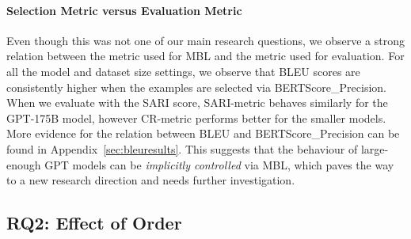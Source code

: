 \documentclass[11pt]{article}
\begin{document}
\begin{table}[!htp]
\begin{center}
\end{center}
\end{table}

\paragraph{Selection Metric versus Evaluation Metric} Even though this was not one of our main research questions, we observe a strong relation between the metric used for MBL and the metric used for evaluation. For all the model and dataset size settings, we observe that BLEU scores are consistently higher when the examples are selected via BERTScore\_Precision. When we evaluate with the SARI score, SARI-metric behaves similarly for the GPT-175B model, however CR-metric performs better for the smaller models. More evidence for the relation between BLEU and BERTScore\_Precision can be found in Appendix~\ref{sec:bleuresults}. This suggests that the behaviour of large-enough GPT models can be \textit{implicitly controlled} via MBL, which paves the way to a new research direction and needs further investigation. 

\subsection{RQ2: Effect of Order}
\label{ssec:rq2}
\end{document}
